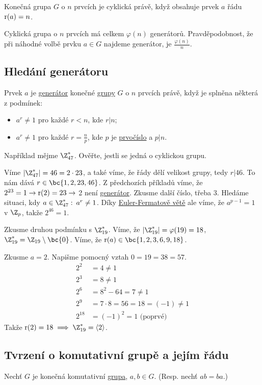 Konečná grupa $G$ o $n$ prvcích je cyklická právě, když obsahuje prvek $a$ řádu $\operatorname*{r}(a) = n$.

Cyklická grupa o $n$ prvcích má celkem $\varphi(n)$ generátorů. Pravděpodobnost, že při náhodné volbě prvku $a \in G$ najdeme generátor, je $\frac{\varphi(n)}{n}$.

\subsection{Hledání generátoru}
Prvek $a$ je \hyperref[generator]{generátor} konečné \hyperref[grupa]{grupy} $G$ o $n$ prvcích právě, když je splněna některá z podmínek:
\vspace{-1em}
\begin{itemize}
	\item $a^r \not=1$ pro každé $r < n$, kde $r | n$;
	\item $a^r \not=1$ pro každé $r = \frac{n}{p}$, kde $p$ je \hyperref[prvocislo]{prvočíslo} a $p | n$.
\end{itemize}
Například mějme $\Z_{47}^*$. Ověřte, jestli se jedná o cyklickou grupu.

Víme $|\Z_{47}^*| = 46 = 2 \cdot 23$, a také víme, že řády dělí velikost grupy, tedy $r|46$. To nám dává $r \in \bc{1, 2, 23, 46}$. Z předchozích příkladů víme, že $2^{23} = 1 \rightarrow \operatorname*{r}(2) = 23 \rightarrow$ 2 není \hyperref[generator]{generátor}.
Zkusme další číslo, třeba $3$. Hledáme situaci, kdy $a \in \Z_{47}^*:\: a^r \not= 1$. Díky \hyperref[eulerFermat]{Euler-Fermatově větě} ale víme, že $a^{p-1} = 1$ v $\Z_p$, takže $2^{46} = 1$.

Zkusme druhou podmínku s $\Z_{19}^*$.
Víme, že $|\Z_{19}^*| = \varphi(19) = 18$, $\Z_{19}^* = \Z_{19} \setminus \bc{0}$. Víme, že $\ra(a) \in \bc{1, 2, 3, 6, 9, 18}$.

Zkusme $a=2$. Napišme pomocný vztah $0 = 19 = 38 = 57$.
\begin{align}
	2^2 &= 4 \not=1 \\
	2^3 &= 8\not= 1\\
	2^6 &= 8^2 - 64 = 7 \not= 1\\
	2^9 &= 7 \cdot 8 = 56 = 18 = (-1) \not= 1\\
	2^{18} &= (-1)^2 = 1 \text{ (poprvé)}
\end{align}
Takže $\ra(2) = 18 \implies \Z_{19}^* = \langle 2 \rangle$.

\subsection{Tvrzení o komutativní grupě a jejím řádu}
Nechť $G$ je konečná komutativní \hyperref[grupa]{grupa}, $a, b \in G$. (Resp. nechť $ab = ba$.)

